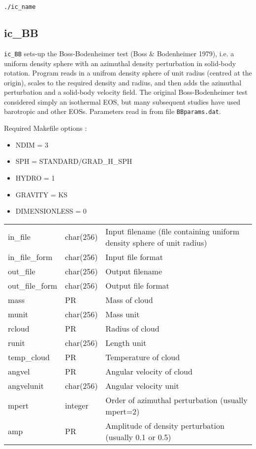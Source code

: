 \documentclass[a4paper]{article}
\newcommand{\var}[1]{\texttt{#1}}
\begin{document}
\var{./ic\_name}


\subsection{ic\_BB}
\var{ic\_BB} sets-up the Boss-Bodenheimer test (Boss \& Bodenheimer 1979), i.e. a uniform density sphere with an azimuthal density perturbation in solid-body rotation.  Program reads in a unifrom density sphere of unit radius (centred at the origin), scales to the required density and radius, and then adds the azimuthal perturbation and a solid-body velocity field.  The original Boss-Bodenheimer test considered simply an isothermal EOS, but many subsequent studies have used barotropic and other EOSs.  Parameters read in from file \var{BBparams.dat}. \newline

\noindent Required Makefile options :
\begin{itemize}
\item NDIM = 3
\item SPH = STANDARD/GRAD\_H\_SPH
\item HYDRO = 1
\item GRAVITY = KS
\item DIMENSIONLESS = 0
\end{itemize}
\vspace{0.1cm}

\tabletail{\hline}
\tablelasttail{\hline}
\begin{center}
\begin{supertabular}{|p{3cm}|p{2cm}|p{8cm}|}
in\_file         & char(256) & Input filename (file containing uniform density sphere of unit radius) \\
in\_file\_form   & char(256) & Input file format \\
out\_file        & char(256) & Output filename \\
out\_file\_form  & char(256) & Output file format \\
mass             & PR       & Mass of cloud \\
munit            & char(256) & Mass unit \\
rcloud           & PR       & Radius of cloud \\
runit            & char(256) & Length unit \\
temp\_cloud      & PR       & Temperature of cloud \\
angvel           & PR       & Angular velocity of cloud \\
angvelunit       & char(256) & Angular velocity unit \\
mpert            & integer  & Order of azimuthal perturbation (usually mpert=2) \\
amp              & PR       & Amplitude of density perturbation (usually 0.1 or 0.5)\\
\end{supertabular}
\end{center}
\end{document}
